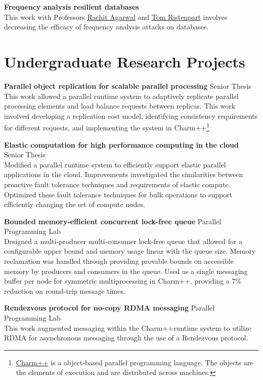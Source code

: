 \documentclass[10pt]{article}
\newcommand{\leftrightrow}[2]{
	#1 \hfill #2 \\
}
\newcommand{\researchblock}[3]{
	\leftrightrow{\textbf{#1}}{#2}#3
}
\begin{document}
\researchblock{Frequency analysis resilient databases}{}
{
	This work with Professors \href{http://www.cs.cornell.edu/~ragarwal/}{Rachit Agarwal}  and \href{https://rist.tech.cornell.edu/}{Tom Ristenpart} involves decreasing the efficacy of frequency analysis attacks on databases.
}

\section{Undergraduate Research Projects}
\vspace{0.1em}
\researchblock{Parallel object replication for scalable parallel processing}{Senior Thesis}
{
	This work allowed a parallel runtime system to adaptively replicate parallel processing elements and load balance requests between replicas. This work involved developing a replication cost model, identifying consistency requirements for different requests, and
	implementing the system in Charm++\footnote[1]{
	\href{http://charm.cs.illinois.edu/research/charm}{Charm++} is a object-based parallel programming language. The objects are the elements of execution and are distributed across machines.}
}

\vspace{0.6em}

\researchblock{Elastic computation for high performance computing in the cloud}{Senior Thesis}
{
	Modified a parallel runtime system to efficiently support elastic parallel applications in the cloud. Improvements investigated the similarities between proactive fault tolerance techniques and requirements of elastic compute. Optimized these fault tolerance techniques for bulk operations to support efficiently changing the set of compute nodes.
}

\vspace{0.6em}

\researchblock{Bounded memory-efficient concurrent lock-free queue}{Parallel Programming Lab}
{
	Designed a multi-producer multi-consumer lock-free queue that allowed for a configurable upper bound and memory usage linear with the queue size. Memory reclamation was handled through providing provable bounds on accessible memory by producers and consumers in the queue. Used as a single messaging buffer per node for symmetric multiprocessing in Charm++\footnotemark[1], providing a 7\% reduction on round-trip message times.
}

\vspace{0.6em}

\researchblock{Rendezvous protocol for no-copy RDMA messaging}{Parallel Programming Lab}{
	This work augmented messaging within the Charm++\footnotemark[1] runtime system to utilize RDMA for asynchronous messaging through the use of a Rendezvous protocol. 
}
\end{document}
